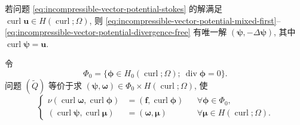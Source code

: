 \begin{Theorem}\label{thm:incompressible-vector-potential-continuous-uniqueness}
若问题 \eqref{eq:incompressible-vector-potential-stokes} 的解满足
$\operatorname{curl}\mathbf u\in H(\operatorname{curl};\Omega)$,
则 \eqref{eq:incompressible-vector-potential-mixed-first}--
\eqref{eq:incompressible-vector-potential-divergence-free}
有唯一解
$(\boldsymbol\psi,-\Delta\boldsymbol\psi)$,
其中 $\operatorname{curl}\boldsymbol\psi=\mathbf u$.
\end{Theorem}

令
\[
\Phi_0=\{\boldsymbol\phi\in H_0(\operatorname{curl};\Omega);
\ \operatorname{div}\boldsymbol\phi=0\}.
\]
问题 $(\widetilde Q)$ 等价于求
$(\boldsymbol\psi,\boldsymbol\omega)
\in\Phi_0\times H(\operatorname{curl};\Omega)$, 使
\begin{equation}\label{eq:incompressible-vector-potential-reduced-problem}
\left\{
\begin{aligned}
\nu(\operatorname{curl}\boldsymbol\omega,
\operatorname{curl}\boldsymbol\phi)
&=(\mathbf f,\operatorname{curl}\boldsymbol\phi)
&&\forall\boldsymbol\phi\in\Phi_0,\\
(\operatorname{curl}\boldsymbol\psi,
\operatorname{curl}\boldsymbol\mu)
&=(\boldsymbol\omega,\boldsymbol\mu)
&&\forall\boldsymbol\mu\in H(\operatorname{curl};\Omega).
\end{aligned}
\right.
\end{equation}

